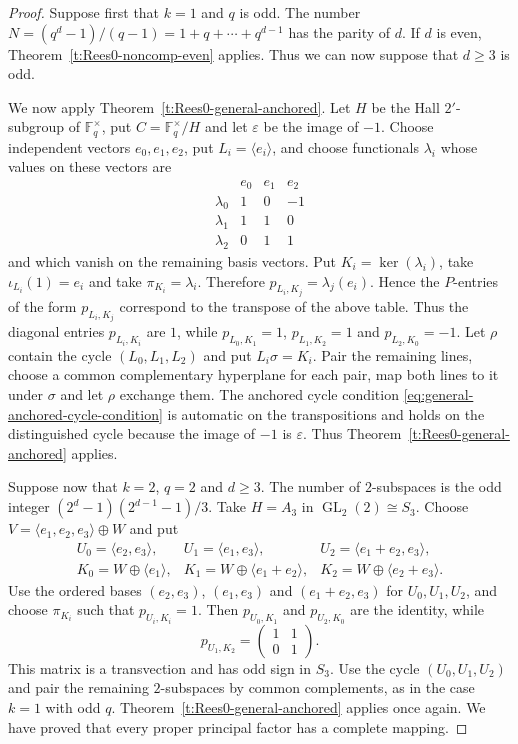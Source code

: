 \documentclass[11pt]{article}
\theoremstyle{plain}
\theoremstyle{remark}
\theoremstyle{definition}
\theoremstyle{plain}
\begin{document}
\begin{proof}
{Suppose first that $k=1$ and $q$ is odd. The number
$N=(q^d-1)/(q-1)=1+q+\cdots+q^{d-1}$ has the parity of $d$.} If $d$ is even,
Theorem~\ref{t:Rees0-noncomp-even} applies. Thus we can now suppose that
$d\ge3$ is odd. 

{We now apply Theorem~\ref{t:Rees0-general-anchored}.} Let $H$ be the Hall $2'$-subgroup of
$\mathbb F_q^\times$, put $C=\mathbb F_q^\times/H$ and let $\varepsilon$
be the image of $-1$. Choose independent vectors $e_0,e_1,e_2$, put
$L_i=\langle e_i\rangle$, and choose functionals $\lambda_i$ whose values on
these vectors are
\[
\begin{array}{c|ccc}
 &e_0&e_1&e_2\\ \hline
\lambda_0&1&0&-1\\
\lambda_1&1&1&0\\
\lambda_2&0&1&1
\end{array}
\]
and which vanish on the remaining basis vectors. Put
$K_i=\ker(\lambda_i)$, take $\iota_{L_i}(1)=e_i$ and take
$\pi_{K_i}=\lambda_i$. Therefore $p_{L_i,K_j}=\lambda_j(e_i)$.
{Hence the $P$-entries of the form $p_{L_i,K_j}$ correspond to the transpose of the above table. Thus the diagonal
entries $p_{L_i,K_i}$} are $1$, while $p_{L_0,K_1}=1$, $p_{L_1,K_2}=1$ and
$p_{L_2,K_0}=-1$. Let $\rho$ contain the cycle $(L_0,L_1,L_2)$ and put
$L_i\sigma=K_i$. Pair the remaining lines, choose a common complementary
hyperplane for each pair, map both lines to it under $\sigma$ and let
$\rho$ exchange them. The anchored cycle condition {\eqref{eq:general-anchored-cycle-condition}} is automatic on the
transpositions and holds on the distinguished cycle because the image of
$-1$ is $\varepsilon$. Thus Theorem~\ref{t:Rees0-general-anchored} applies.

Suppose now that $k=2$, $q=2$ and $d\ge3$. The number of $2$-subspaces is
the odd integer $(2^d-1)(2^{d-1}-1)/3$. Take $H=A_3$ in
$\operatorname{GL}_2(2)\cong S_3$. Choose
$V=\langle e_1,e_2,e_3\rangle\oplus W$ and put
\[
\begin{array}{lll}
U_0=\langle e_2,e_3\rangle,
&U_1=\langle e_1,e_3\rangle,
&U_2=\langle e_1+e_2,e_3\rangle,\\
K_0=W\oplus\langle e_1\rangle,
&K_1=W\oplus\langle e_1+e_2\rangle,
&K_2=W\oplus\langle e_2+e_3\rangle.
\end{array}
\]
Use the ordered bases $(e_2,e_3)$, $(e_1,e_3)$ and
$(e_1+e_2,e_3)$ for $U_0,U_1,U_2$, and choose $\pi_{K_i}$ such that
$p_{U_i,K_i}=1$. Then $p_{U_0,K_1}$ and $p_{U_2,K_0}$ are the identity,
while
\[
        p_{U_1,K_2}=\begin{pmatrix}1&1\\0&1\end{pmatrix}.
\]
This matrix is a transvection and has odd sign in $S_3$. Use the cycle
$(U_0,U_1,U_2)$ and pair the remaining $2$-subspaces by common complements, {as in the case $k=1$ with odd $q$.}
Theorem~\ref{t:Rees0-general-anchored} applies once again. We have proved
that every proper principal factor has a complete mapping.


\end{proof}
\end{document}

